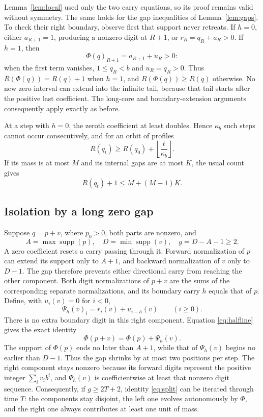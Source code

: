 \documentclass[11pt]{article}
\begin{document}
Lemma~\ref{lem:local} used only the two carry equations, so its proof
remains valid without symmetry. The same holds for the gap inequalities
of Lemma~\ref{lem:gaps}. To check their right boundary, observe first that
support never retreats. If $h=0$, either $a_{R+1}=1$, producing a
nonzero digit at $R+1$, or $r_R=q_R+a_R>0$. If $h=1$, then
\[
 \Phi(q)_{R+1}=a_{R+1}+u_R>0:
\]
when the first term vanishes, $1\leq q_R<b$ and $u_R=q_R>0$.
Thus $R(\Phi(q))=R(q)+1$ when $h=1$, and
$R(\Phi(q))\geq R(q)$ otherwise. No new zero interval can extend into
the infinite tail, because that tail starts after the positive last
coefficient. The long-core and boundary-extension arguments consequently
apply exactly as before.

At a step with $h=0$, the zeroth coefficient at least doubles. Hence
$\kappa_b$ such steps cannot occur consecutively, and for an orbit of
profiles
\begin{equation}\label{eq:profilegrowth}
 R(q_t)\geq R(q_0)+\left\lfloor\frac t{\kappa_b}\right\rfloor.
\end{equation}
If its mass is at most $M$ and its internal gaps are at most $K$, the
usual count gives
\begin{equation}\label{eq:profilewidth}
 R(q_t)+1\leq M+(M-1)K.
\end{equation}

\subsection*{Isolation by a long zero gap}
Suppose $q=p+v$, where $p_0>0$, both parts are nonzero, and
\[
 A=\max\operatorname{supp}(p),\quad
 D=\min\operatorname{supp}(v),\quad g=D-A-1\geq2.
\]
A zero coefficient resets a carry passing through it. Forward normalization
of $p$ can extend its support only to $A+1$, and backward normalization
of $v$ only to $D-1$. The gap therefore prevents either directional
carry from reaching the other component. Both digit normalizations of
$p+v$ are the sums of the corresponding separate normalizations, and its
boundary carry $h$ equals that of $p$.
Define, with $u_i(v)=0$ for $i<0$,
\[
 \Psi_h(v)_i=r_i(v)+u_{i-h}(v)\qquad(i\geq0).
\]
There is no extra boundary digit in this right component. Equation
\eqref{eq:halfline} gives the exact identity
\begin{equation}\label{eq:split}
 \Phi(p+v)=\Phi(p)+\Psi_h(v).
\end{equation}
The support of $\Phi(p)$ ends no later than $A+1$, while that of
$\Psi_h(v)$ begins no earlier than $D-1$. Thus the gap shrinks by at
most two positions per step. The right component stays nonzero because
its forward digits represent the positive integer $\sum_i v_i b^i$,
and $\Psi_h(v)$ is coefficientwise at least that nonzero digit sequence.
Consequently, if $g\geq2T+2$, identity \eqref{eq:split} can be iterated
through time $T$: the components stay disjoint, the left one evolves
autonomously by $\Phi$, and the right one always contributes at least
one unit of mass.
\end{document}
